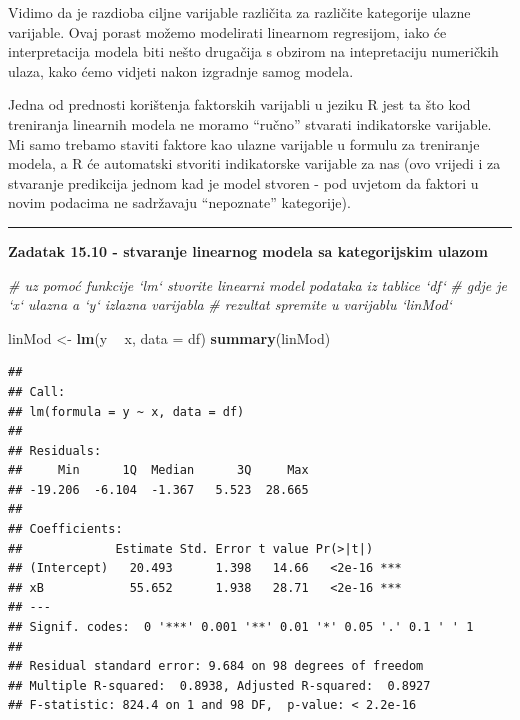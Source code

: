 \documentclass[]{book}
\newenvironment{Shaded}{\begin{snugshade}}{\end{snugshade}}
\newcommand{\KeywordTok}[1]{\textcolor[rgb]{0.13,0.29,0.53}{\textbf{#1}}}
\newcommand{\DataTypeTok}[1]{\textcolor[rgb]{0.13,0.29,0.53}{#1}}
\newcommand{\StringTok}[1]{\textcolor[rgb]{0.31,0.60,0.02}{#1}}
\newcommand{\CommentTok}[1]{\textcolor[rgb]{0.56,0.35,0.01}{\textit{#1}}}
\newcommand{\OperatorTok}[1]{\textcolor[rgb]{0.81,0.36,0.00}{\textbf{#1}}}
\newcommand{\NormalTok}[1]{#1}
\theoremstyle{definition}
\theoremstyle{definition}
\theoremstyle{definition}
\theoremstyle{remark}
\begin{document}
Vidimo da je razdioba ciljne varijable različita za različite kategorije
ulazne varijable. Ovaj porast možemo modelirati linearnom regresijom,
iako će interpretacija modela biti nešto drugačija s obzirom na
intepretaciju numeričkih ulaza, kako ćemo vidjeti nakon izgradnje samog
modela.

Jedna od prednosti korištenja faktorskih varijabli u jeziku R jest ta
što kod treniranja linearnih modela ne moramo ``ručno'' stvarati
indikatorske varijable. Mi samo trebamo staviti faktore kao ulazne
varijable u formulu za treniranje modela, a R će automatski stvoriti
indikatorske varijable za nas (ovo vrijedi i za stvaranje predikcija
jednom kad je model stvoren - pod uvjetom da faktori u novim podacima ne
sadržavaju ``nepoznate'' kategorije).

\begin{center}\rule{0.5\linewidth}{\linethickness}\end{center}

\textbf{Zadatak 15.10 - stvaranje linearnog modela sa kategorijskim
ulazom}

\begin{Shaded}
\begin{Highlighting}[]
\CommentTok{# uz pomoć funkcije `lm` stvorite linearni model podataka iz tablice `df`}
\CommentTok{# gdje je `x` ulazna a `y` izlazna varijabla}
\CommentTok{# rezultat spremite u varijablu `linMod`}
\end{Highlighting}
\end{Shaded}

\begin{Shaded}
\begin{Highlighting}[]
\NormalTok{linMod <-}\StringTok{ }\KeywordTok{lm}\NormalTok{(y }\OperatorTok{~}\StringTok{ }\NormalTok{x, }\DataTypeTok{data =}\NormalTok{ df)}
\KeywordTok{summary}\NormalTok{(linMod)}
\end{Highlighting}
\end{Shaded}

\begin{verbatim}
## 
## Call:
## lm(formula = y ~ x, data = df)
## 
## Residuals:
##     Min      1Q  Median      3Q     Max 
## -19.206  -6.104  -1.367   5.523  28.665 
## 
## Coefficients:
##             Estimate Std. Error t value Pr(>|t|)    
## (Intercept)   20.493      1.398   14.66   <2e-16 ***
## xB            55.652      1.938   28.71   <2e-16 ***
## ---
## Signif. codes:  0 '***' 0.001 '**' 0.01 '*' 0.05 '.' 0.1 ' ' 1
## 
## Residual standard error: 9.684 on 98 degrees of freedom
## Multiple R-squared:  0.8938, Adjusted R-squared:  0.8927 
## F-statistic: 824.4 on 1 and 98 DF,  p-value: < 2.2e-16
\end{verbatim}
\end{document}

